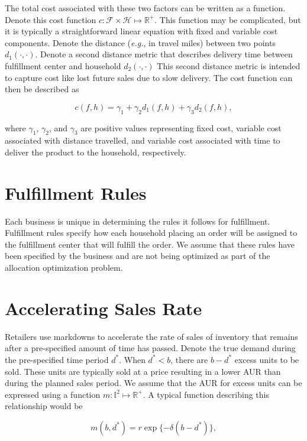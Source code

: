 \documentclass[11pt, oneside]{article}   	%
\begin{document}
The total cost associated with these two factors can be written as a function.  Denote this cost function $c \colon \mathcal{F} \times \mathcal{H} \mapsto \mathbb{R}^+$.  This function may be complicated, but it is typically a straightforward linear equation with fixed and variable cost components.  Denote the distance (\emph{e.g.}, in travel miles) between two points $d_1(\cdot, \cdot)$.  Denote a second distance metric that describes delivery time between fulfillment center and household $d_2(\cdot, \cdot)$  This second distance metric is intended to capture cost like lost future sales due to slow delivery.  The cost function can then be described as

$$c (f, h) = \gamma_{1} + \gamma_{2} d_1(f, h) + \gamma_{3} d_2(f, h),$$

\noindent where $\gamma_{1}$, $\gamma_{2}$, and $\gamma_{3}$ are positive values representing fixed cost, variable cost associated with distance travelled, and variable cost associated with time to deliver the product to the household, respectively.

\section{Fulfillment Rules}

Each business is unique in determining the rules it follows for fulfillment.  Fulfillment rules specify how each household placing an order will be assigned to the fulfillment center that will fulfill the order.  We assume that these rules have been specified by the business and are not being optimized as part of the allocation optimization problem.

\section{Accelerating Sales Rate}

Retailers use markdowns to accelerate the rate of sales of inventory that remains after a pre-specified amount of time has passed.  Denote the true demand during the pre-specified time period $d^*$.  When $d^* < b$, there are $b - d^*$ excess units to be sold.  These units are typically sold at a price resulting in a lower AUR than during the planned sales period.  We assume that the AUR for excess units can be expressed using a function $m \colon \mathbb{I}^2 \mapsto \mathbb{R}^+$.  A typical function describing this relationship would be

$$m (b, d^*) = r \exp \{- \delta (b - d^*) \},$$
\end{document}
